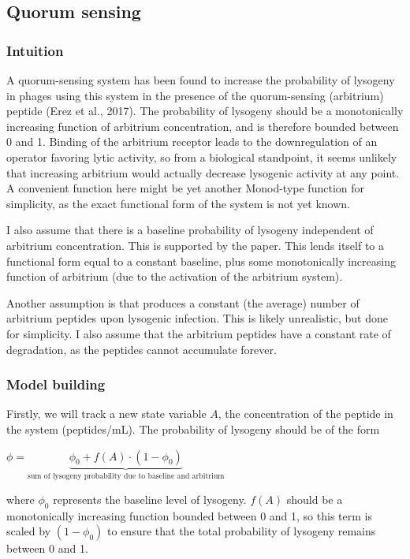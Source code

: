 \documentclass{article}
\begin{document}
\subsection{Quorum sensing}
\subsubsection{Intuition}
A quorum-sensing system has been found to increase the probability of lysogeny in phages using this system in the presence of the quorum-sensing (arbitrium) peptide (Erez et al., 2017). 
The probability of lysogeny should be a monotonically increasing function of arbitrium concentration, and is therefore bounded between 0 and 1. Binding of the arbitrium receptor leads to the downregulation of an operator favoring lytic activity, so from a biological standpoint, it seems unlikely that increasing arbitrium would actually decrease lysogenic activity at any point. A convenient function here might be yet another Monod-type function for simplicity, as the exact functional form of the system is not yet known. 

I also assume that there is a baseline probability of lysogeny independent of arbitrium concentration. This is supported by the paper. This lends itself to a functional form equal to a constant baseline, plus some monotonically increasing function of arbitrium (due to the activation of the arbitrium system).

Another assumption is that produces a constant (the average) number of arbitrium peptides upon lysogenic infection. This is likely unrealistic, but done for simplicity. I also assume that the arbitrium peptides have a constant rate of degradation, as the peptides cannot accumulate forever. 

\subsubsection{Model building}
Firstly, we will track a new state variable $A$, the concentration of the peptide in the system (peptides/mL). The probability of lysogeny should be of the form

\begin{center}
$ \phi = \underbrace{\phi_0 + f(A) \cdot (1-\phi_0)}_{\text{sum of lysogeny probability due to baseline and arbitrium}}$
\end{center}

where $\phi_0$ represents the baseline level of lysogeny. $f(A)$ should be a monotonically increasing function bounded between 0 and 1, so this term is scaled by $(1-\phi_0)$ to ensure that the total probability of lysogeny remains between 0 and 1.
\end{document}
